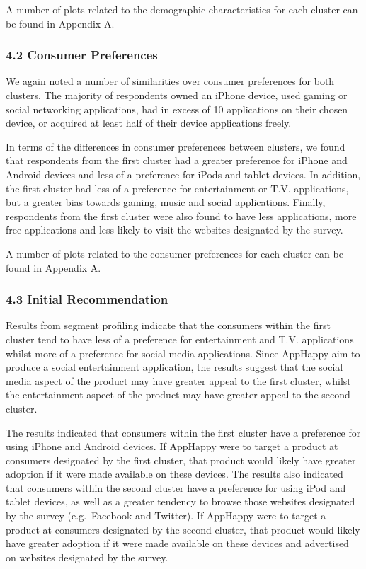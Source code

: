 \documentclass[]{article}
\begin{document}
A number of plots related to the demographic characteristics for each
cluster can be found in Appendix A.

\subsubsection{4.2 Consumer Preferences}\label{consumer-preferences}

We again noted a number of similarities over consumer preferences for
both clusters. The majority of respondents owned an iPhone device, used
gaming or social networking applications, had in excess of 10
applications on their chosen device, or acquired at least half of their
device applications freely.

In terms of the differences in consumer preferences between clusters, we
found that respondents from the first cluster had a greater preference
for iPhone and Android devices and less of a preference for iPods and
tablet devices. In addition, the first cluster had less of a preference
for entertainment or T.V. applications, but a greater bias towards
gaming, music and social applications. Finally, respondents from the
first cluster were also found to have less applications, more free
applications and less likely to visit the websites designated by the
survey.

A number of plots related to the consumer preferences for each cluster
can be found in Appendix A.

\subsubsection{4.3 Initial Recommendation}\label{initial-recommendation}

Results from segment profiling indicate that the consumers within the
first cluster tend to have less of a preference for entertainment and
T.V. applications whilst more of a preference for social media
applications. Since AppHappy aim to produce a social entertainment
application, the results suggest that the social media aspect of the
product may have greater appeal to the first cluster, whilst the
entertainment aspect of the product may have greater appeal to the
second cluster.

The results indicated that consumers within the first cluster have a
preference for using iPhone and Android devices. If AppHappy were to
target a product at consumers designated by the first cluster, that
product would likely have greater adoption if it were made available on
these devices. The results also indicated that consumers within the
second cluster have a preference for using iPod and tablet devices, as
well as a greater tendency to browse those websites designated by the
survey (e.g.~Facebook and Twitter). If AppHappy were to target a product
at consumers designated by the second cluster, that product would likely
have greater adoption if it were made available on these devices and
advertised on websites designated by the survey.
\end{document}
